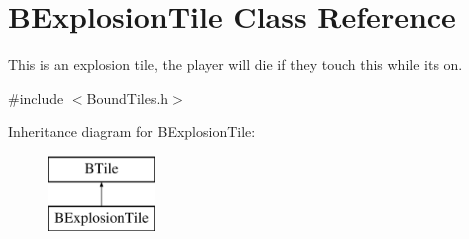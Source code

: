 \hypertarget{class_b_explosion_tile}{\section{\-B\-Explosion\-Tile \-Class \-Reference}
\label{class_b_explosion_tile}
}


\-This is an explosion tile, the player will die if they touch this while its on.  




{\ttfamily \#include $<$\-Bound\-Tiles.\-h$>$}

\-Inheritance diagram for \-B\-Explosion\-Tile\-:\begin{figure}[H]
\begin{center}
\leavevmode
\includegraphics[height=2.000000cm]{class_b_explosion_tile}
\end{center}
\end{figure}
